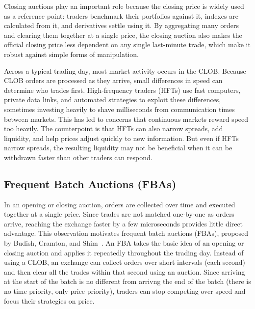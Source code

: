 \documentclass[runningheads]{llncs}
\begin{document}
Closing auctions play an important role because the closing price is widely used as a reference point: traders benchmark their portfolios against it, indexes are calculated from it, and derivatives settle using it. By aggregating many orders and clearing them together at a single price, the closing auction also makes the official closing price less dependent on any single last-minute trade, which make it robust against simple forms of manipulation. %

Across a typical trading day, most market activity occurs in the CLOB. Because CLOB orders are processed as they arrive, small differences in speed can determine who trades first. High-frequency traders (HFTs) use fast computers, private data links, and automated strategies to exploit these differences, sometimes investing heavily to shave milliseconds from communication times between markets. This has led to concerns that continuous markets reward speed too heavily. The counterpoint is that HFTs can also narrow spreads, add liquidity, and help prices adjust quickly to new information. But even if HFTs narrow spreads, the resulting liquidity may not be beneficial when it can be withdrawn faster than other traders can respond.

\subsection{Frequent Batch Auctions (FBAs)}

In an opening or closing auction, orders are collected over time and executed together at a single price. Since trades are not matched one-by-one as orders arrive, reaching the exchange faster by a few microseconds provides little direct advantage. This observation motivates frequent batch auctions (FBAs), proposed by Budish, Cramton, and Shim~\cite{BCS15}. An FBA takes the basic idea of an opening or closing auction and applies it repeatedly throughout the trading day. Instead of using a CLOB, an exchange can collect orders over short intervals (\eg each second) and then clear all the trades within that second using an auction. Since arriving at the start of the batch is no different from arrivng the end of the batch (there is no time priority, only price priority), traders can stop competing over speed and focus their strategies on price.
\end{document}
